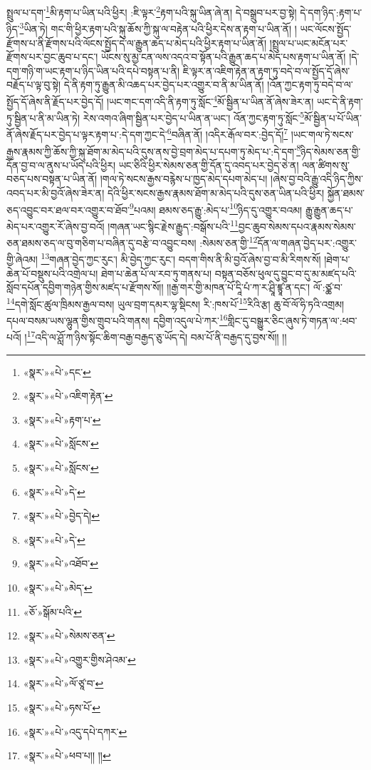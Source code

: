 སྤྲུལ་པ་དག་\footnote{«སྣར་»«པེ་»དང་}མི་རྟག་པ་ཡིན་པའི་ཕྱིར། :ཇི་ལྟར་\footnote{«སྣར་»«པེ་»འཇིག་རྟེན་}རྟག་པའི་སྐུ་ཡིན་ཞེ་ན། དེ་བསྒྲུབ་པར་བྱ་སྟེ། དེ་དག་ཉིད་:རྟག་པ་ཉིད་\footnote{«སྣར་»«པེ་»རྟག་པ་}ཡིན་ཏེ། གང་གི་ཕྱིར་རྟག་པའི་སྐུ་ཆོས་ཀྱི་སྐུ་ལ་བརྟེན་པའི་ཕྱིར་དེས་ན་རྟག་པ་ཡིན་ནོ། །
ཡང་ལོངས་སྤྱོད་རྫོགས་པ་ནི་རྫོགས་པའི་ལོངས་སྤྱོད་དེ་ལ་རྒྱུན་ཆད་པ་མེད་པའི་ཕྱིར་རྟག་པ་ཡིན་ནོ། །སྤྲུལ་པ་ཡང་མངོན་པར་རྫོགས་པར་བྱང་ཆུབ་པ་དང་། ཡོངས་སུ་མྱ་ངན་ལས་འདའ་བ་སྟོན་པའི་རྒྱུན་ཆད་པ་མེད་པས་རྟག་པ་ཡིན་ནོ། །དེ་དག་གཉི་ག་ཡང་རྟག་པ་ཉིད་ཡིན་པའི་དཔེ་བསྟན་པ་ནི། ཇི་ལྟར་ན་འཇིག་རྟེན་ན་རྟག་ཏུ་བདེ་བ་ལ་སྤྱོད་དོ་ཞེས་བརྗོད་པ་ལྟ་བུ་སྟེ། དེ་ནི་རྟག་ཏུ་རྒྱུན་མི་འཆད་པར་བྱེད་པར་འགྱུར་བ་ནི་མ་ཡིན་ནོ། །འོན་ཀྱང་རྟག་ཏུ་བདེ་བ་ལ་སྤྱོད་དོ་ཞེས་ནི་རྗོད་པར་བྱེད་དོ། །ཡང་གང་དག་འདི་ནི་རྟག་ཏུ་སློང་\footnote{«སྣར་»«པེ་»སློངས་}མོ་སྦྱིན་པ་ཡིན་ནོ་ཞེས་ཟེར་ན། ཡང་དེ་ནི་རྟག་ཏུ་སྦྱིན་པ་ནི་མ་ཡིན་ཏེ། རེས་འགའ་ཞིག་སྦྱིན་པར་བྱེད་པ་ཡིན་ན་ཡང་། འོན་ཀྱང་རྟག་ཏུ་སློང་\footnote{«སྣར་»«པེ་»སློངས་}མོ་སྦྱིན་པ་པོ་ཡིན་ནོ་ཞེས་རྗོད་པར་བྱེད་པ་ལྟར་རྟག་པ་:དེ་དག་ཀྱང་དེ་\footnote{«སྣར་»«པེ་»དེ་}བཞིན་ནོ། །འདིར་རྒོལ་བར་:བྱེད་དོ།\footnote{«སྣར་»«པེ་»བྱེད་དེ།} །ཡང་གལ་ཏེ་སངས་རྒྱས་རྣམས་ཀྱི་ཆོས་ཀྱི་སྐུ་ཐོག་མ་མེད་པའི་དུས་ནས་བྱེ་བྲག་མེད་པ་དཔག་ཏུ་མེད་པ་:དེ་དག་\footnote{«སྣར་»«པེ་»དེ་}ཉིད་སེམས་ཅན་གྱི་དོན་བྱ་བ་ལ་ནུས་པ་ཡོད་པའི་ཕྱིར། ཡང་ཅིའི་ཕྱིར་སེམས་ཅན་གྱི་དོན་དུ་འབད་པར་བྱེད་ཅེ་ན། ལན་ཚིགས་སུ་བཅད་པས་བསྟན་པ་ཡིན་ནོ། །གལ་ཏེ་སངས་རྒྱས་བརྙེས་པ་ཁྱད་མེད་དཔག་མེད་པ། །ཞེས་བྱ་བའི་རྒྱུ་འདི་ཉིད་ཀྱིས་འབད་པར་མི་བྱའོ་ཞེས་ཟེར་ན། དེའི་ཕྱིར་སངས་རྒྱས་རྣམས་ཐོག་མ་མེད་པའི་དུས་ཅན་ཡིན་པའི་ཕྱིར། སྐྱོན་ཐམས་ཅད་འབྱུང་བར་ཐལ་བར་འགྱུར་བ་ཐོབ་\footnote{«སྣར་»«པེ་»འཐོབ་}པའམ། ཐམས་ཅད་རྒྱུ་:མེད་པ་\footnote{«སྣར་»«པེ་»མེད་}ཉིད་དུ་འགྱུར་བའམ། རྒྱུ་རྒྱུན་ཆད་པ་མེད་པར་འགྱུར་རོ་ཞེས་བྱ་བའོ། །གཞན་ཡང་སྙིང་རྗེས་རྒྱུད་:བསྒོས་པའི་\footnote{«ཅོ་»སྒོམ་པའི་}བྱང་ཆུབ་སེམས་དཔའ་རྣམས་སེམས་ཅན་ཐམས་ཅད་ལ་བུ་གཅིག་པ་བཞིན་དུ་བརྩེ་བ་འབྱུང་བས། :སེམས་ཅན་གྱི་\footnote{«སྣར་»«པེ་»སེམས་ཅན་}དོན་ལ་གཞན་བྱེད་པར་:འགྱུར་གྱི་ཞེའམ། \footnote{«སྣར་»«པེ་»འགྱུར་གྱིས་ཤེའམ་}གཞན་བྱེད་ཀྱང་རུང་། མི་བྱེད་ཀྱང་རུང་། བདག་གིས་ནི་མི་བྱའོ་ཞེས་བྱ་བ་མི་རིགས་སོ། །ཐེག་པ་ཆེན་པོ་བསྡུས་པའི་འགྲེལ་པ། ཐེག་པ་ཆེན་པོ་ལ་རབ་ཏུ་གནས་པ། བསྟན་བཅོས་ཕུལ་དུ་བྱུང་བ་དུ་མ་མཛད་པའི་སློབ་དཔོན་དབྱིག་གཉེན་གྱིས་མཛད་པ་རྫོགས་སོ།། །།རྒྱ་གར་གྱི་མཁན་པོ་དཱི་པཾ་ཀ་ར་ཤྲཱི་ཛྙཱ་ན་དང་། ལོ་:ཙྪ་བ་\footnote{«སྣར་»«པེ་»ལོ་ཙཱ་བ་}དགེ་སློང་ཚུལ་ཁྲིམས་རྒྱལ་བས། ཡུལ་བྲག་དམར་ལྷ་སྡིངས། རི་:ཁས་པོ་\footnote{«སྣར་»«པེ་»ཧས་པོ་}རིའི་རྩ། ཆུ་བོ་ལོ་ཧི་ཏའི་འགྲམ། དཔལ་བསམ་ཡས་ལྷུན་གྱིས་གྲུབ་པའི་གནས། དབྱིག་འདུལ་པེ་ཀར་\footnote{«སྣར་»«པེ་»འདུ་དཔེ་དཀར་}གླིང་དུ་བསྒྱུར་ཅིང་ཞུས་ཏེ་གཏན་ལ་:ཕབ་པའོ། །\footnote{«སྣར་»«པེ་»ཕབ་པ།། །།}འདི་ལ་ཤློ་ཀ་ཉིས་སྟོང་ཆིག་བརྒྱ་བརྒྱད་ཅུ་ཡོད་དེ། བམ་པོ་ནི་བརྒྱད་དུ་བྱས་སོ།། །།